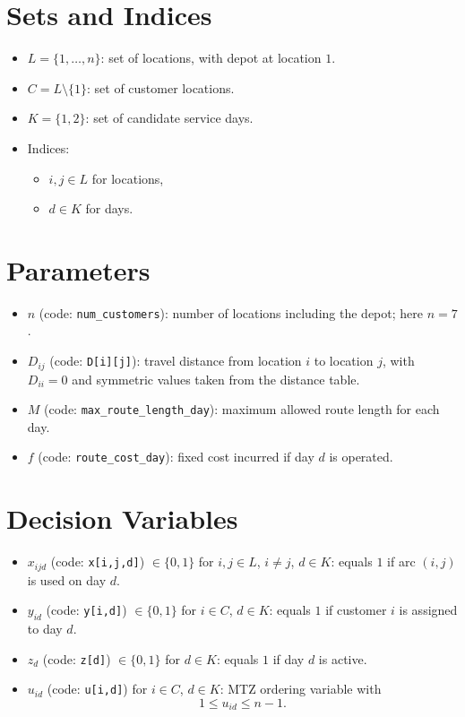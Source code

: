 \section*{Sets and Indices}

\begin{itemize}
    \item $L = \{1,\dots,n\}$: set of locations, with depot at location $1$.
    \item $C = L \setminus \{1\}$: set of customer locations.
    \item $K = \{1,2\}$: set of candidate service days.
    \item Indices:
    \begin{itemize}
        \item $i,j \in L$ for locations,
        \item $d \in K$ for days.
    \end{itemize}
\end{itemize}

\section*{Parameters}

\begin{itemize}
    \item $n$ (code: \texttt{num\_customers}): number of locations including the depot; here $n=7$.
    \item $D_{ij}$ (code: \texttt{D[i][j]}): travel distance from location $i$ to location $j$, with $D_{ii}=0$ and symmetric values taken from the distance table.
    \item $M$ (code: \texttt{max\_route\_length\_day}): maximum allowed route length for each day.
    \item $f$ (code: \texttt{route\_cost\_day}): fixed cost incurred if day $d$ is operated.
\end{itemize}

\section*{Decision Variables}

\begin{itemize}
    \item $x_{ijd}$ (code: \texttt{x[i,j,d]}) $\in \{0,1\}$ for $i,j \in L$, $i \neq j$, $d \in K$:
    equals $1$ if arc $(i,j)$ is used on day $d$.
    \item $y_{id}$ (code: \texttt{y[i,d]}) $\in \{0,1\}$ for $i \in C$, $d \in K$:
    equals $1$ if customer $i$ is assigned to day $d$.
    \item $z_d$ (code: \texttt{z[d]}) $\in \{0,1\}$ for $d \in K$:
    equals $1$ if day $d$ is active.
    \item $u_{id}$ (code: \texttt{u[i,d]}) for $i \in C$, $d \in K$:
    MTZ ordering variable with
    \[
    1 \le u_{id} \le n-1.
    \]
\end{itemize}

